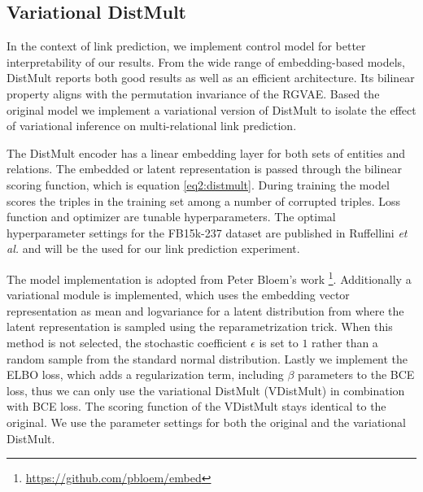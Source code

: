 \subsection{Variational DistMult}
\label{ssec4:vdistm}

In the context of link prediction, we implement control model for better interpretability of our results. From the wide range of embedding-based models, DistMult reports both good results as well as an efficient architecture. Its bilinear property aligns with the permutation invariance of the RGVAE. Based the original model we implement a variational version of DistMult to isolate the effect of variational inference on multi-relational link prediction.

The DistMult encoder has a linear embedding layer for both sets of entities and relations. The embedded or latent representation is passed through the bilinear scoring function, which is equation \ref{eq2:distmult}. During training the model scores the triples in the training set among a number of corrupted triples. Loss function and optimizer are tunable hyperparameters. The optimal hyperparameter settings for the FB15k-237 dataset are published in Ruffellini \textit{et al.} \cite{ruffinelli_you_2019} and will be the used for our link prediction experiment.

The model implementation is adopted from Peter Bloem's work \footnote{\url{https://github.com/pbloem/embed}}. Additionally a variational module is implemented, which uses the embedding vector representation as mean and logvariance for a latent distribution from where the latent representation is sampled using the reparametrization trick. When this method is not selected, the stochastic coefficient $\epsilon$ is set to $1$ rather than a random sample from the standard normal distribution. Lastly we implement the ELBO loss, which adds a regularization term, including $\beta$ parameters to the BCE loss, thus we can only use the variational DistMult (VDistMult) in combination with BCE loss. The scoring function of the VDistMult stays identical to the original. We use the parameter settings for both the original and the variational DistMult. 



